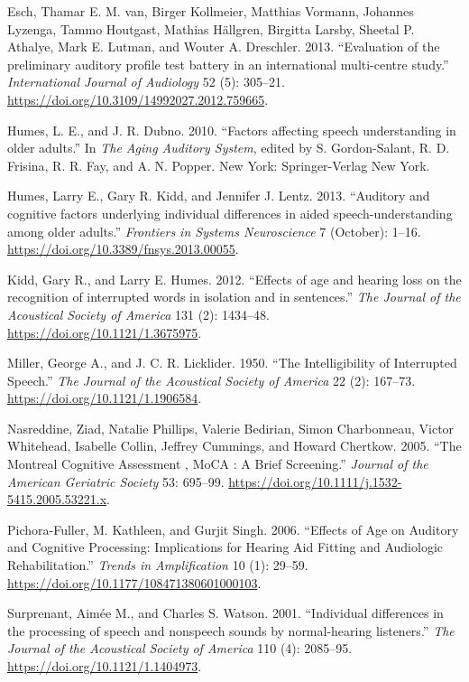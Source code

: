 \documentclass[a4paper,nobind]{templates/ociamthesis}
\begin{document}
\begin{CSLReferences}{1}{0}
\leavevmode\hypertarget{ref-VanEsch2013}{}%
Esch, Thamar E. M. van, Birger Kollmeier, Matthias Vormann, Johannes Lyzenga, Tammo Houtgast, Mathias Hällgren, Birgitta Larsby, Sheetal P. Athalye, Mark E. Lutman, and Wouter A. Dreschler. 2013. {``{Evaluation of the preliminary auditory profile test battery in an international multi-centre study}.''} \emph{International Journal of Audiology} 52 (5): 305--21. \url{https://doi.org/10.3109/14992027.2012.759665}.

\leavevmode\hypertarget{ref-Humes2010}{}%
Humes, L. E., and J. R. Dubno. 2010. {``{Factors affecting speech understanding in older adults}.''} In \emph{The Aging Auditory System}, edited by S. Gordon-Salant, R. D. Frisina, R. R. Fay, and A. N. Popper. New York: Springer-Verlag New York.

\leavevmode\hypertarget{ref-Humes2013}{}%
Humes, Larry E., Gary R. Kidd, and Jennifer J. Lentz. 2013. {``{Auditory and cognitive factors underlying individual differences in aided speech-understanding among older adults}.''} \emph{Frontiers in Systems Neuroscience} 7 (October): 1--16. \url{https://doi.org/10.3389/fnsys.2013.00055}.

\leavevmode\hypertarget{ref-Kidd2012}{}%
Kidd, Gary R., and Larry E. Humes. 2012. {``{Effects of age and hearing loss on the recognition of interrupted words in isolation and in sentences}.''} \emph{The Journal of the Acoustical Society of America} 131 (2): 1434--48. \url{https://doi.org/10.1121/1.3675975}.

\leavevmode\hypertarget{ref-Miller1950}{}%
Miller, George A., and J. C. R. Licklider. 1950. {``{The Intelligibility of Interrupted Speech}.''} \emph{The Journal of the Acoustical Society of America} 22 (2): 167--73. \url{https://doi.org/10.1121/1.1906584}.

\leavevmode\hypertarget{ref-Nasreddine2005}{}%
Nasreddine, Ziad, Natalie Phillips, Valerie Bedirian, Simon Charbonneau, Victor Whitehead, Isabelle Collin, Jeffrey Cummings, and Howard Chertkow. 2005. {``{The Montreal Cognitive Assessment , MoCA : A Brief Screening}.''} \emph{Journal of the American Geriatric Society} 53: 695--99. \url{https://doi.org/10.1111/j.1532-5415.2005.53221.x}.

\leavevmode\hypertarget{ref-Pichora-Fuller2006}{}%
Pichora-Fuller, M. Kathleen, and Gurjit Singh. 2006. {``{Effects of Age on Auditory and Cognitive Processing: Implications for Hearing Aid Fitting and Audiologic Rehabilitation}.''} \emph{Trends in Amplification} 10 (1): 29--59. \url{https://doi.org/10.1177/108471380601000103}.

\leavevmode\hypertarget{ref-Surprenant2001}{}%
Surprenant, Aimée M., and Charles S. Watson. 2001. {``{Individual differences in the processing of speech and nonspeech sounds by normal-hearing listeners}.''} \emph{The Journal of the Acoustical Society of America} 110 (4): 2085--95. \url{https://doi.org/10.1121/1.1404973}.

\end{CSLReferences}
\end{document}
